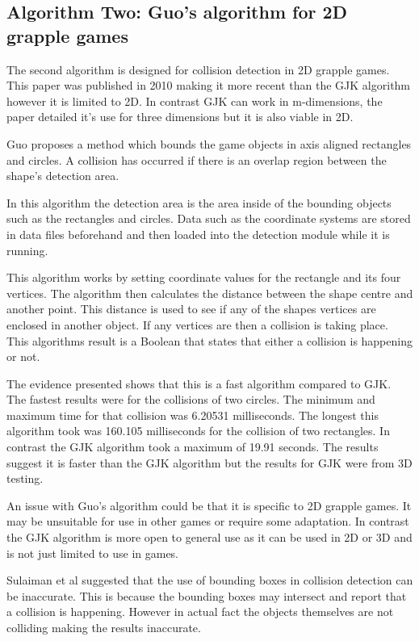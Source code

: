 \documentclass{scrartcl}
\begin{document}
\subsection{Algorithm Two: Guo's algorithm for 2D grapple games}
 The second algorithm is designed for collision detection in 2D grapple games. This paper was published in 2010 making it more recent than the GJK algorithm however it is limited to 2D. In contrast GJK can work in m-dimensions, the paper detailed it’s use for three dimensions but it is also viable in 2D.  
 
 Guo \cite{Guo} proposes a method which bounds the game objects in axis aligned rectangles and circles. A collision has occurred if there is an overlap region between the shape's detection area.
 
 In this algorithm the detection area is the area inside of the bounding objects such as the rectangles and circles.  Data such as the coordinate systems are stored in data files beforehand and then loaded into the detection module while it is running.
 
 This algorithm works by setting coordinate values for the rectangle and its four vertices.  The algorithm then calculates the distance between the shape centre and another point. This distance is used to see if any of the shapes vertices are enclosed in another object. If any vertices are then a collision is taking place. This algorithms result is a Boolean that states that either a collision is happening or not.
 
 The evidence presented shows that this is a fast algorithm compared to GJK. The fastest results were for the collisions of two circles. The minimum and maximum time for that collision was 6.20531 milliseconds. The longest this algorithm took  was 160.105 milliseconds for the collision of two rectangles.  In contrast the GJK algorithm took a maximum of 19.91 seconds.  The results suggest it is faster than the GJK algorithm but the results for GJK were from 3D testing.
 
 An issue with Guo's algorithm could be that it is specific to 2D grapple games. It may be unsuitable for use in other games or require some adaptation. In contrast the GJK algorithm is more open to general use as it can be used in 2D or 3D and is not just limited to use in games.
 
 Sulaiman et al \cite{Sulaiman} suggested that the use of bounding boxes in collision detection can be inaccurate. This is because the bounding boxes may intersect and report that a collision is happening. However in actual fact the objects themselves are not colliding making the results inaccurate.
\end{document}
